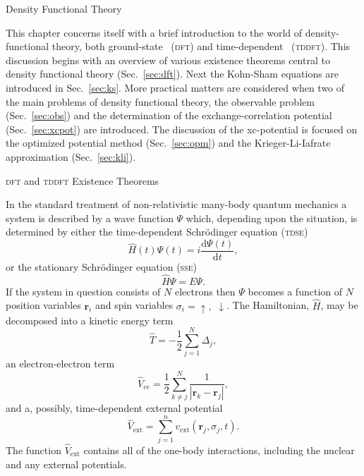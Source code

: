 \documentclass[letterpaper, 11 pt]{report}
\begin{document}
\begin{chapter}{Density Functional Theory \label{chap:dft}}

   This chapter concerns itself with a brief introduction to the world of density-functional theory,
   both ground-state~\cite{dft-engel} (\textsc{dft}) and time-dependent~\cite{tddft, ullrich, marques-1}
   (\textsc{tddft}). This discussion begins with an overview  of various existence theorems central to
   density functional theory (Sec.~\ref{sec:dft}). Next the Kohn-Sham equations are introduced in
   Sec.~\ref{sec:ks}. More practical matters are considered when two of the main problems of density
   functional theory, the observable problem (Sec.~\ref{sec:obs}) and the determination of the
   exchange-correlation potential (Sec.~\ref{sec:xcpot}) are introduced. The discussion of the
   xc-potential is focused on the optimized potential method (Sec.~\ref{sec:opm}) and the
   Krieger-Li-Iafrate approximation (Sec.~\ref{sec:kli}).

   \begin{section}{\textsc{dft} and \textsc{tddft} Existence Theorems \label{sec:dft}}

      In the standard treatment of non-relativistic many-body quantum mechanics a system is described by
      a wave function $\Psi$ which, depending upon the situation, is determined by either the
      time-dependent Schr\"{o}dinger equation (\textsc{tdse})
      \begin{equation} \label{eq:tdse}
         \hat{H}(t) \Psi(t) = i \frac{\mathrm{d} \Psi(t)}{\mathrm{d} t},
      \end{equation}
      or the stationary Schr\"{o}dinger equation (\textsc{sse})
      \begin{equation} \label{eq:sse}
         \hat{H} \Psi = E \Psi.
      \end{equation}
      If the system in question consists of $N$ electrons then $\Psi$ becomes a function of $N$ position
      variables $\mathbf{r}_i$ and spin variables $\sigma_i = \uparrow,$ $\downarrow$. The Hamiltonian,
      $\hat{H}$, may be decomposed into a kinetic energy term
      \begin{equation} \label{eq:Top}
         \hat{T} = -\frac{1}{2} \sum\limits^{N}_{j=1} \Delta_j,
      \end{equation}
      an electron-electron term
      \begin{equation} \label{eq:Vee}
         \hat{V}_{ee} = \frac{1}{2} \sum\limits^{N}_{k \neq j}
                        \frac{1}{\left| \mathbf{r}_k - \mathbf{r}_j \right|},
      \end{equation}
      and a, possibly, time-dependent external potential
      \begin{equation} \label{eq:Vext}
         \hat{V}_\mathrm{ext} = \sum\limits^{n}_{j = 1} v_\mathrm{ext} (\mathbf{r}_j, \sigma_j, t).
      \end{equation}
      The function $\hat{V}_\mathrm{ext}$ contains all of the one-body interactions, including the
      nuclear and any external potentials.


\end{section}
\end{chapter}
\end{document}
